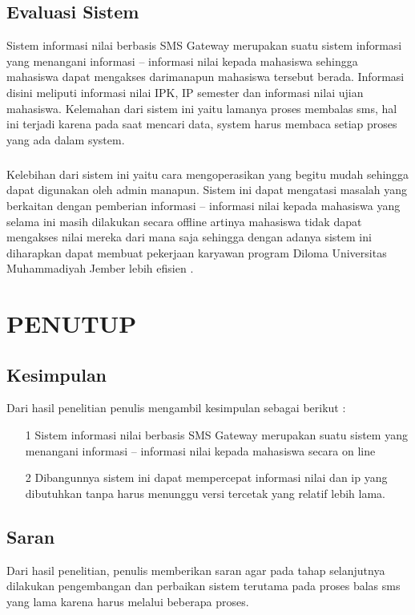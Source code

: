\documentclass{jtetiproposalskripsi}
\begin{document}
\section{Evaluasi Sistem}
Sistem informasi nilai berbasis SMS Gateway merupakan suatu sistem informasi yang menangani informasi – informasi nilai kepada mahasiswa sehingga mahasiswa dapat mengakses darimanapun mahasiswa tersebut berada. Informasi disini meliputi informasi nilai IPK, IP semester dan informasi nilai ujian mahasiswa.
Kelemahan dari sistem ini yaitu lamanya proses membalas sms, hal ini terjadi karena pada saat mencari data, system harus membaca setiap proses yang ada dalam system.
\paragraph{}
Kelebihan dari sistem ini yaitu cara mengoperasikan yang begitu mudah sehingga dapat digunakan oleh admin manapun. Sistem ini dapat mengatasi masalah yang berkaitan dengan pemberian informasi – informasi nilai kepada mahasiswa yang selama ini masih dilakukan secara offline artinya mahasiswa tidak dapat mengakses nilai mereka dari mana saja sehingga dengan adanya sistem ini diharapkan dapat membuat pekerjaan karyawan program Diloma  Universitas Muhammadiyah Jember  lebih efisien .

\chapter{PENUTUP}
\section{Kesimpulan}
Dari hasil penelitian penulis mengambil kesimpulan sebagai berikut :
\begin{itemize}
\item[1]Sistem informasi nilai berbasis SMS Gateway merupakan suatu sistem yang menangani informasi – informasi nilai kepada mahasiswa secara on line
\item[2]Dibangunnya sistem ini dapat mempercepat informasi nilai dan ip yang dibutuhkan tanpa harus menunggu versi tercetak yang relatif lebih lama.
\end{itemize}

\section{Saran}
Dari hasil penelitian, penulis memberikan saran agar pada tahap selanjutnya dilakukan pengembangan dan perbaikan sistem terutama pada proses balas sms yang lama karena harus melalui beberapa proses.
\end{document}
